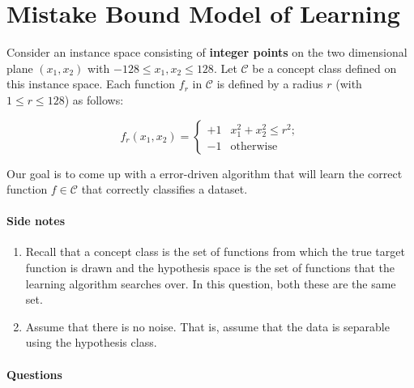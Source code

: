 \section{Mistake Bound Model of Learning}

Consider an instance space consisting of {\bf integer points} on the
two dimensional plane $(x_1, x_2)$ with $-128 \leq x_1, x_2 \leq 128$.
Let $\mathcal C$ be a concept class defined on this instance space.
Each function $f_r$ in $\mathcal C$ is defined by a radius $r$ (with
$1 \leq r \leq 128$) as follows:

\begin{equation}
f_r(x_1, x_2) = \left\{
    \begin{array}{rl}
      +1 & x_1^2 + x_2^2 \leq r^2;\\
      -1 & \mbox{otherwise}
    \end{array}
\right.
\label{eq:f_r}
\end{equation}


Our goal is to come up with a error-driven algorithm that will learn
the correct function $f \in \mathcal{C}$ that correctly classifies a
dataset.

\paragraph{Side notes}
\begin{enumerate}
\item Recall that a concept class is the set of functions from which
  the true target function is drawn and the hypothesis space is the
  set of functions that the learning algorithm searches over. In this
  question, both these are the same set.
\item Assume that there is no noise. That is, assume that the data is
  separable using the hypothesis class.
\end{enumerate}


\paragraph{Questions}

